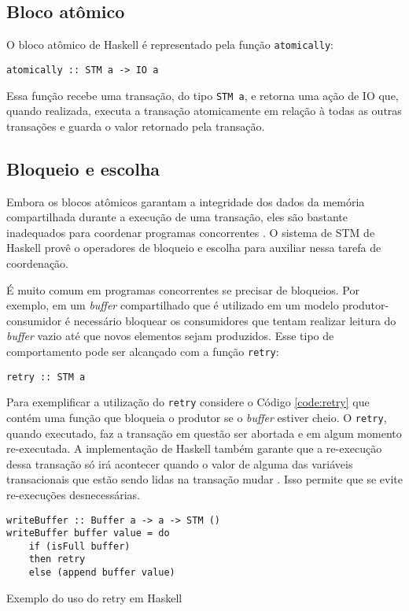 \subsection{Bloco atômico}

O bloco atômico de Haskell é representado pela função \verb|atomically|:
\begin{verbatim}
atomically :: STM a -> IO a
\end{verbatim}

Essa função recebe uma transação, do tipo \verb|STM a|, e retorna uma ação de IO que, quando realizada, executa a transação atomicamente em relação à todas as outras transações  e guarda o valor retornado pela transação.

\subsection{Bloqueio e escolha}

Embora os blocos atômicos garantam a integridade dos dados da memória compartilhada durante a execução de uma transação, eles são bastante inadequados para coordenar programas concorrentes \cite{jones2007beautiful}. O sistema de STM de Haskell provê o operadores de bloqueio e escolha para auxiliar nessa tarefa de coordenação.

É muito comum em programas concorrentes se precisar de bloqueios. Por exemplo, em um \emph{buffer} compartilhado que é utilizado em um modelo produtor-consumidor é necessário bloquear os consumidores que tentam realizar leitura do \emph{buffer} vazio até que novos elementos sejam produzidos. Esse tipo de comportamento pode ser alcançado com a função \verb|retry|:
\begin{verbatim}
retry :: STM a
\end{verbatim}

Para exemplificar a utilização do \verb|retry| considere o Código \ref{code:retry} que contém uma função que bloqueia o produtor se o \emph{buffer} estiver cheio. O \verb|retry|, quando executado, faz a transação em questão ser abortada e em algum momento re-executada. A implementação de Haskell também garante que a re-execução dessa transação só irá acontecer quando o valor de alguma das variáveis transacionais que estão sendo lidas na transação mudar \cite{harris2005composable}. Isso permite que se evite re-execuções desnecessárias.

\begin{listing}
  \begin{verbatim}
writeBuffer :: Buffer a -> a -> STM ()
writeBuffer buffer value = do
    if (isFull buffer)
    then retry
    else (append buffer value)
  \end{verbatim}
  \caption{Exemplo do uso do retry em Haskell}
  \label{code:retry}
\end{listing}

